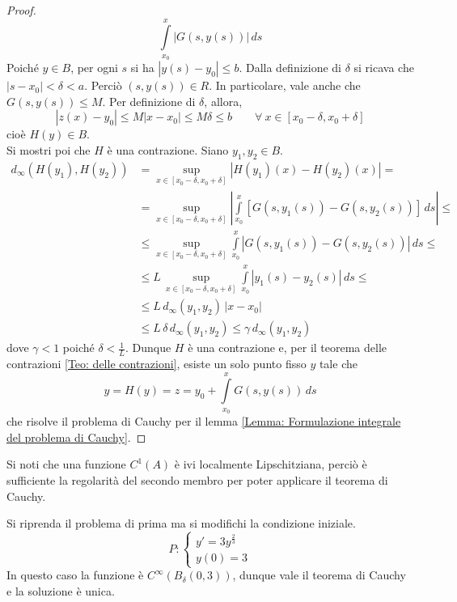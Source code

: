 \begin{proof}
\begin{equation*}
\int\limits_{x_0}^{x}\left|{G(s, y(s))}\right|\,ds
\end{equation*}
Poiché $y \in B$, per ogni $s$ si ha $|y(s)-y_0|\leq b$. Dalla definizione di $\delta$ si ricava che $|s-x_0|<\delta<a$. Perciò $(s, y(s)) \in R$. In particolare, vale anche che $G(s, y(s)) \leq M$. Per definizione di $\delta$, allora,
\begin{equation*}
    |z(x)-y_0|\leq M|x-x_0|\leq M\delta \leq b \qquad \forall\ x \in [x_0-\delta, x_0+\delta]
\end{equation*}
cioè $H(y) \in B$.\\
Si mostri poi che $H$ è una contrazione. Siano $y_1, y_2 \in B$.
\begin{equation*}
\begin{aligned}
    d_\infty(H(y_1), H(y_2))&= \sup_{x \in [x_0-\delta, x_0+\delta]}{|H(y_1)(x)-H(y_2)(x)|}=\\
    &=\sup_{x \in [x_0-\delta, x_0+\delta]}\left|{\int\limits_{x_0}^{x}{\left[G(s,y_1(s))-G(s, y_2(s))\right]}}\,ds\right| \leq \\
    &\leq \sup_{x \in [x_0-\delta, x_0+\delta]}{\int\limits_{x_0}^{x}{\left|G(s,y_1(s))-G(s, y_2(s))\right|}}\,ds \leq\\
    &\leq L\,  \sup_{x \in [x_0-\delta, x_0+\delta]}{\int\limits_{x_0}^{x}{\left|y_1(s)-y_2(s)\right|}}\,ds\leq\\
    &\leq L \,d_\infty(y_1, y_2)\, |x-x_0| \\
    &\leq L\, \delta\, d_\infty(y_1, y_2) \leq \gamma\, d_\infty(y_1,y_2)
\end{aligned}
\end{equation*}
dove $\gamma<1$ poiché $\delta<\tfrac{1}{L}$. Dunque $H$ è una contrazione e, per il teorema delle contrazioni \eqref{Teo: delle contrazioni}, esiste un solo punto fisso $y$ tale che
\begin{equation*}
    y=H(y)=z= y_0+ \int\limits_{x_0}^{x}{G(s, y(s))}\,ds
\end{equation*}
che risolve il problema di Cauchy per il lemma \ref{Lemma: Formulazione integrale del problema di Cauchy}.
\end{proof}
\begin{oss}
    Si noti che una funzione $C^1(A)$ è ivi localmente Lipschitziana, perciò  è sufficiente la regolarità del secondo membro per poter applicare il teorema di Cauchy.
\end{oss}
\begin{example}
    Si riprenda il problema di prima ma si modifichi la condizione iniziale.
    \begin{equation*}
        P: \begin{cases}
        y'=3y^{\frac{2}{3}}\\
        y(0)=3
    \end{cases}
    \end{equation*}
    In questo caso la funzione è $C^\infty(B_\delta(0,3))$, dunque vale il teorema di Cauchy e la soluzione è unica.
\end{example}

